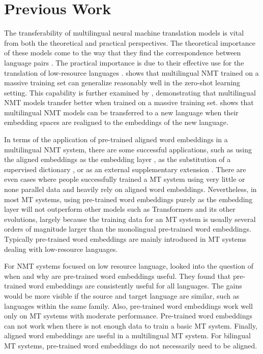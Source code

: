 \documentclass[thesis,fonts=libertine]{cluu}
\begin{document}
\section{Previous Work}
\label{sec:previous_work}

The transferability of multilingual neural machine translation models is vital from both the theoretical and practical perspectives. The theoretical importance of these models come to the way that they find the correspondence between language pairs \parencite{Johnson:2016aa,lu-etal-2018-neural}. The practical importance is due to their effective use for the translation of low-resource languages \parencite{Zoph:2016aa,Nguyen:2017aa}. \textcite{Johnson:2016aa} shows that multilingual NMT trained on a massive training set can generalize reasonably well in the zero-shot learning setting. This capability is further examined by \textcite{aharoni-etal-2019-massively}, demonstrating that multilingual NMT models transfer better when trained on a massive training set. \textcite{Kim:2019aa} shows that multilingual NMT models can be transferred to a new language when their embedding spaces are realigned to the embeddings of the new language.

In terms of the application of pre-trained aligned word embeddings in a multilingual NMT system, there are some successful applications, such as using the aligned embeddings as the embedding layer \parencite{neishi-etal-2017-bag, Artetxe:2017aa}, as the substitution of a supervised dictionary \parencite{Conneau:2017aa}, or as an external supplementary extension \parencite{inproceedings}. There are even cases where people successfully trained a MT system using very little or none parallel data \parencite{Conneau:2017aa} and heavily rely on aligned word embeddings. Nevertheless, in most MT systems, using pre-trained word embeddings purely as the embedding layer will not outperform other models such as Transformers \parencite{Vaswani:2017aa} and its other evolutions, largely because the training data for an MT system is usually several orders of magnitude larger than the monolingual pre-trained word embeddings. Typically pre-trained word embeddings are mainly introduced in MT systems dealing with low-resource languages.

For NMT systems focused on low resource language, \textcite{Qi:2018aa} looked into the question of when and why are pre-trained word embeddings useful. They found that pre-trained word embeddings are consistently useful for all languages. The gains would be more visible if the source and target language are similar, such as languages within the same family. Also, pre-trained word embeddings work well only on MT systems with moderate performance. Pre-trained word embeddings can not work when there is not enough data to train a basic MT system. Finally, aligned word embeddings are useful in a multilingual MT system. For bilingual MT systems, pre-trained word embeddings do not necessarily need to be aligned.
\end{document}
